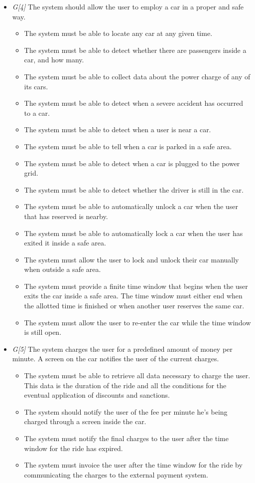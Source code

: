 \begin{itemize}
				\item \textit{G[4]} The system should allow the user to employ a car in a proper and safe way. 
					\begin{itemize}
						\item The system must be able to locate any car at any given time. 
						\item The system must be able to detect whether there are passengers inside a car, and how many.
						\item The system must be able to collect data about the power charge of any of its cars.
						\item The system must be able to detect when a severe accident has occurred to a car.
						\item The system must be able to detect when a user is near a car.
						\item The system must be able to tell when a car is parked in a safe area.
						\item The system must be able to detect when a car is plugged to the power grid.
						\item The system must be able to detect whether the driver is still in the car.
						\item The system must be able to automatically unlock a car when the user that has reserved is nearby. %
						\item The system must be able to automatically lock a car when the user has exited it inside a safe area. 
						\item The system must allow the user to lock and unlock their car manually when outside a safe area.
						\item The system must provide a finite time window that begins when the user exits the car inside a safe area. The time window must either end when the allotted time is finished or when another user reserves the same car.
						\item The system must allow the user to re-enter the car while the time window is still open. 
					\end{itemize}
					
				\item \textit{G[5]} The system charges the user for a predefined amount of money per minute. A screen on the car notifies the user of the current charges.
					\begin{itemize}
						\item The system must be able to retrieve all data necessary to charge the user. This data is the duration of the ride and all the conditions for the eventual application of discounts and sanctions.
						\item The system should notify the user of the fee per minute he's being charged through a screen inside the car.
						\item The system must notify the final charges to the user after the time window for the ride has expired.
						\item The system must invoice the user after the time window for the ride by communicating the charges to the external payment system. 
						

\end{itemize}
\end{itemize}
